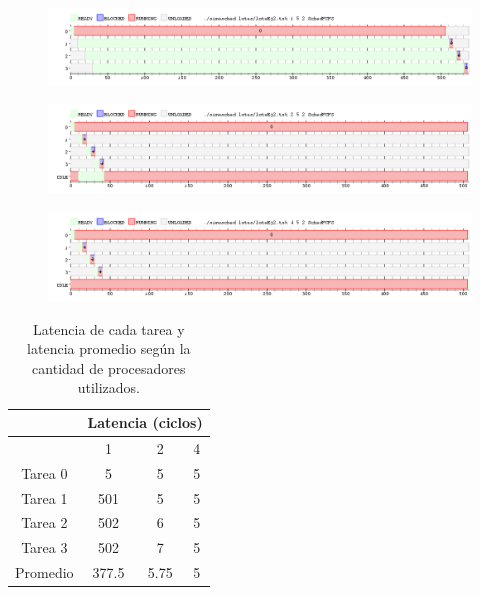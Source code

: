 
\begin{figure}[H]
  \centering
  \includegraphics[width=1\textwidth]{img/imgEj2-1}
  \caption{}
  \label{fig:ej2-1}
\end{figure}

\begin{figure}[H]
  \centering
  \includegraphics[width=1\textwidth]{img/imgEj2-2}
  \caption{}
  \label{fig:ej2-2}
\end{figure}

\begin{figure}[H]
  \centering
  \includegraphics[width=1\textwidth]{img/imgEj2-3}
  \caption{}
  \label{fig:ej2-3}
\end{figure}

\begin{table}[H]
  \center
  \begin{center}
  \begin{tabular}{c|c|c|c|}
    \cline{2-4}
    & \multicolumn{3}{|c|}{\cellcolor{LightCyan}Latencia (ciclos)} \\
    \hline
    \rowcolor{LightCyan}
    \multicolumn{1}{|c|}{\#Procesadores} & 1 & 2 & 4 \\
    \hline
    \multicolumn{1}{|c|}{\cellcolor{LightCyan}Tarea 0} & 5 & 5 & 5 \\
    \multicolumn{1}{|c|}{\cellcolor{LightCyan}Tarea 1} & 501 & 5 & 5 \\
    \multicolumn{1}{|c|}{\cellcolor{LightCyan}Tarea 2} & 502 & 6 & 5 \\
    \multicolumn{1}{|c|}{\cellcolor{LightCyan}Tarea 3} & 502 & 7 & 5 \\
    \hline
    \multicolumn{1}{|c|}{\cellcolor{LightCyan}Promedio} & 377.5 & 5.75 & 5 \\
    \hline
  \end{tabular}
  \end{center}
  \caption{\footnotesize Latencia de cada tarea y latencia promedio según la cantidad de procesadores utilizados.}
  \label{tab:ej2}
\end{table}

